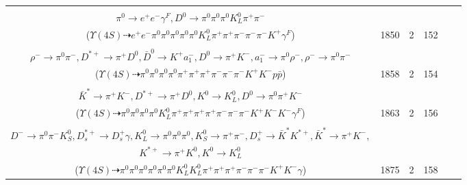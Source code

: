 \documentclass[landscape]{article}
\newcounter{rownumbers}
\newcommand\rn{\stepcounter{rownumbers}\arabic{rownumbers}}
\newcommand{\EOLP}{\\ \hline} %
\newcommand{\topoTags}[1]{#1} %
\begin{document}
\begin{longtable}{clcccc}
\rn & \makecell[l]{ $ 
\Upsilon(4S) \rightarrow B^{0} \bar{B}^{0} ,
B^{0} \rightarrow \pi^{0} \rho^{-} K^{+} ,
\bar{B}^{0} \rightarrow \rho^{-} D^{*+} ,
\rho^{-} \rightarrow \pi^{0} \pi^{-} ,
\rho^{-} \rightarrow \pi^{0} \pi^{-} ,
D^{*+} \rightarrow \pi^{+} D^{0} ,
$ \\ $
\pi^{0} \rightarrow e^{+} e^{-} \gamma^{F} ,
D^{0} \rightarrow \pi^{0} \pi^{0} \pi^{0} K_{L}^{0} \pi^{+} \pi^{-} 
$ \\ ($
\Upsilon(4S) \dashrightarrow e^{+} e^{-} \pi^{0} \pi^{0} \pi^{0} \pi^{0} \pi^{0} K_{L}^{0} \pi^{+} \pi^{+} \pi^{-} \pi^{-} \pi^{-} K^{+} \gamma^{F} 
$) } & \topoTags{1850 & }2 & 152 \EOLP

\rn & \makecell[l]{ $ 
\Upsilon(4S) \rightarrow B^{0} \bar{B}^{0} ,
B^{0} \rightarrow D^{*-} \bar{\Delta}^{-} \Delta^{++} ,
\bar{B}^{0} \rightarrow \rho^{-} D^{*+} ,
D^{*-} \rightarrow \pi^{-} \bar{D}^{0} ,
\bar{\Delta}^{-} \rightarrow \pi^{0} \bar{p} ,
\Delta^{++} \rightarrow \pi^{+} p ,
$ \\ $
\rho^{-} \rightarrow \pi^{0} \pi^{-} ,
D^{*+} \rightarrow \pi^{+} D^{0} ,
\bar{D}^{0} \rightarrow K^{+} a_{1}^{-} ,
D^{0} \rightarrow \pi^{+} K^{-} ,
a_{1}^{-} \rightarrow \pi^{0} \rho^{-} ,
\rho^{-} \rightarrow \pi^{0} \pi^{-} 
$ \\ ($
\Upsilon(4S) \dashrightarrow \pi^{0} \pi^{0} \pi^{0} \pi^{0} \pi^{+} \pi^{+} \pi^{+} \pi^{-} \pi^{-} \pi^{-} K^{+} K^{-} p \bar{p} 
$) } & \topoTags{1858 & }2 & 154 \EOLP

\rn & \makecell[l]{ $ 
\Upsilon(4S) \rightarrow B^{0} \bar{B}^{0} ,
B^{0} \rightarrow \pi^{0} \bar{D}^{0} ,
\bar{B}^{0} \rightarrow \pi^{-} \eta K^{*} \bar{K}^{*} D^{*+} ,
\bar{D}^{0} \rightarrow \pi^{0} \pi^{-} K^{+} ,
\eta \rightarrow \pi^{+} \pi^{-} \gamma^{F} ,
K^{*} \rightarrow \pi^{0} K^{0} ,
$ \\ $
\bar{K}^{*} \rightarrow \pi^{+} K^{-} ,
D^{*+} \rightarrow \pi^{+} D^{0} ,
K^{0} \rightarrow K_{L}^{0} ,
D^{0} \rightarrow \pi^{0} \pi^{+} K^{-} 
$ \\ ($
\Upsilon(4S) \dashrightarrow \pi^{0} \pi^{0} \pi^{0} \pi^{0} K_{L}^{0} \pi^{+} \pi^{+} \pi^{+} \pi^{+} \pi^{-} \pi^{-} \pi^{-} K^{+} K^{-} K^{-} \gamma^{F} 
$) } & \topoTags{1863 & }2 & 156 \EOLP

\rn & \makecell[l]{ $ 
\Upsilon(4S) \rightarrow B^{0} \bar{B}^{0} ,
B^{0} \rightarrow \pi^{0} \bar{D}^{0} ,
\bar{B}^{0} \rightarrow \bar{K}^{0} \bar{K}^{0} D^{-} D_{s}^{*+} ,
\bar{D}^{0} \rightarrow \pi^{0} \pi^{-} K^{+} ,
\bar{K}^{0} \rightarrow K_{L}^{0} ,
\bar{K}^{0} \rightarrow K_{L}^{0} ,
$ \\ $
D^{-} \rightarrow \pi^{0} \pi^{-} K_{S}^{0} ,
D_{s}^{*+} \rightarrow D_{s}^{+} \gamma ,
K_{L}^{0} \rightarrow \pi^{0} \pi^{0} \pi^{0} ,
K_{S}^{0} \rightarrow \pi^{+} \pi^{-} ,
D_{s}^{+} \rightarrow \bar{K}^{*} K^{*+} ,
\bar{K}^{*} \rightarrow \pi^{+} K^{-} ,
$ \\ $
K^{*+} \rightarrow \pi^{+} K^{0} ,
K^{0} \rightarrow K_{L}^{0} 
$ \\ ($
\Upsilon(4S) \dashrightarrow \pi^{0} \pi^{0} \pi^{0} \pi^{0} \pi^{0} \pi^{0} K_{L}^{0} K_{L}^{0} \pi^{+} \pi^{+} \pi^{+} \pi^{-} \pi^{-} \pi^{-} K^{+} K^{-} \gamma 
$) } & \topoTags{1875 & }2 & 158 \EOLP


\end{longtable}
\end{document}
